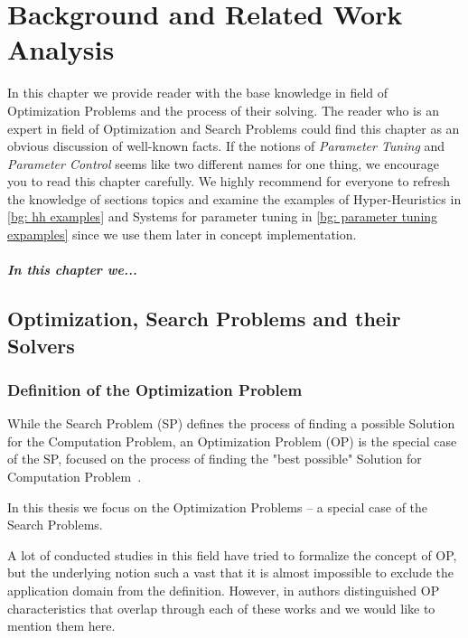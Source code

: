 \chapter{Background and Related Work Analysis}\label{bg}
In this chapter we provide reader with the base knowledge in field of Optimization Problems and the process of their solving.
The reader who is an expert in field of Optimization and Search Problems could find this chapter as an obvious discussion of well-known facts. If the notions of \textit{Parameter Tuning} and \textit{Parameter Control} seems like two different names for one thing, we encourage you to read this chapter carefully.
We highly recommend for everyone to refresh the knowledge of sections topics and examine the examples of Hyper-Heuristics in \ref{bg: hh examples} and Systems for parameter tuning in \ref{bg: parameter tuning expamples} since we use them later in concept implementation.

\paragraph{In this chapter we...} 


\section{Optimization, Search Problems and their Solvers}\label{bg:opt problems and solvers}


\subsection{Definition of the Optimization Problem}
While the Search Problem (SP) defines the process of finding a possible Solution for the Computation Problem, an Optimization Problem (OP) is the special case of the SP, focused on the process of finding the "best possible" Solution for Computation Problem~\cite{goldreich2010p}.


In this thesis we focus on the Optimization Problems -- a special case of the Search Problems.


A lot of conducted studies in this field have tried to formalize the concept of OP, but the underlying notion such a vast that it is almost impossible to exclude the application domain from the definition. However, in \cite{biegler2004retrospective,figueira2014hybrid,amaran2016simulation} authors distinguished OP characteristics that overlap through each of these works and we would like to mention them here.


